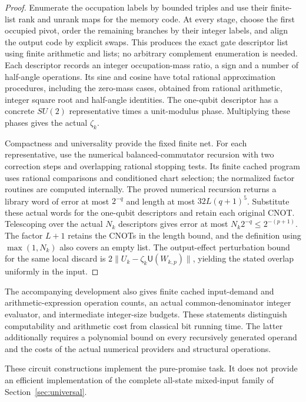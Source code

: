 \begin{proof}
Enumerate the occupation labels by bounded triples and use their finite-list rank and unrank maps for the memory code. At every stage, choose the first occupied pivot, order the remaining branches by their integer labels, and align the output code by explicit swaps. This produces the exact gate descriptor list using finite arithmetic and lists; no arbitrary complement enumeration is needed. Each descriptor records an integer occupation-mass ratio, a sign and a number of half-angle operations. Its sine and cosine have total rational approximation procedures, including the zero-mass cases, obtained from rational arithmetic, integer square root and half-angle identities. The one-qubit descriptor has a concrete $SU(2)$ representative times a unit-modulus phase. Multiplying these phases gives the actual $\zeta_k$.

Compactness and universality provide the fixed finite net. For each representative, use the numerical balanced-commutator recursion with two correction steps and overlapping rational stopping tests. Its finite cached program uses rational comparisons and conditioned chart selection; the normalized factor routines are computed internally. The proved numerical recursion returns a library word of error at most $2^{-q}$ and length at most $32L(q+1)^5$. Substitute these actual words for the one-qubit descriptors and retain each original CNOT. Telescoping over the actual $N_k$ descriptors gives error at most $N_k2^{-q}\le2^{-(p+1)}$. The factor $L+1$ retains the CNOTs in the length bound, and the definition using $\max(1,N_k)$ also covers an empty list. The output-effect perturbation bound for the same local discard is $2\|U_k-\zeta_k\mathsf U(W_{k,p})\|$, yielding the stated overlap uniformly in the input.
\end{proof}

The accompanying development also gives finite cached input-demand and arithmetic-expression operation counts, an actual common-denominator integer evaluator, and intermediate integer-size budgets. These statements distinguish computability and arithmetic cost from classical bit running time. The latter additionally requires a polynomial bound on every recursively generated operand and the costs of the actual numerical providers and structural operations.

These circuit constructions implement the pure-promise task. It does not provide an efficient implementation of the complete all-state mixed-input family of Section~\ref{sec:universal}.

